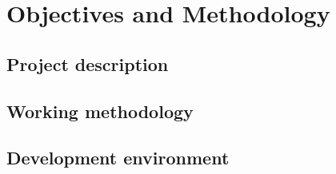 \chapter{Objectives and Methodology}\label{ch:objandmeth}


\section{Project description}


\section{Working methodology}


\section{Development environment}


